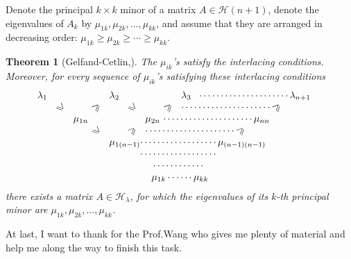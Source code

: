 \documentclass[11pt]{amsart}
\numberwithin{equation}{section}
\theoremstyle{plain}
\newtheorem{theorem}{Theorem}[section]
\theoremstyle{plain}
\numberwithin{equation}{section}
\theoremstyle{remark}
\begin{document}
Denote the principal $k \times k$ minor of a matrix $A \in \mathcal{H}(n+1)$, denote the eigenvalues of $A_k$ by $\mu_{1k},\mu_{2k},\ldots,\mu_{kk}$, and assume that they are arranged in decreasing order: $\mu_{1k}\geqslant \mu_{2k}\geqslant \cdots\geqslant\mu_{kk}$. 
\begin{theorem}[{Gelfand-Cetlin,\cite{VR}}]
The $\mu_{ik}$'s satisfy the interlacing conditions. Moreover, for every sequence of $\mu_{ik}$'s satisfying these interlacing conditions
\[
\begin{array}{p{3mm}p{3mm}p{3mm}p{3mm}p{3mm}p{3mm}p{3mm}p{3mm}p{3mm}p{45mm}}
$\lambda_1$&&&&$\lambda_2$&&&&$\lambda_3$&$\cdots\cdots\cdots\cdots\cdots\cdots\cdots\lambda_{n+1}$\\
&$\rotatebox[origin=c]{-45}{$\geqslant$}$&&$\rotatebox[origin=c]{45}{$\geqslant$}$&&$\rotatebox[origin=c]{-45}{$\geqslant$}$&&$\rotatebox[origin=c]{45}{$\geqslant$}$&$\cdots\cdots\cdots\cdots\cdots\cdots\cdots\rotatebox[origin=c]{45}{$\geqslant$}$&\\
&&$\mu_{1n}$&&&&$\mu_{2n}$&$\cdots\cdots\cdots\cdots\cdots\cdots\cdots\mu_{nn}$&&\\
&&&$\rotatebox[origin=c]{-45}{$\geqslant$}$&&$\rotatebox[origin=c]{45}{$\geqslant$}$&$\cdots\cdots\cdots\cdots\cdots\cdots\cdots\rotatebox[origin=c]{45}{$\geqslant$}$&&&\\
&&&& $\mu_{1(n-1)}$&$\phantom{\cdots}\cdots\cdots\cdots\cdots\cdots\cdots\mu_{(n-1)(n-1)}$&&&&\\
&&&&&$\phantom{\cdots}\cdots\cdots\cdots\cdots\cdots\cdots$\\
&&&&&$\phantom{\cdots\cdots}\cdots\cdots\cdots\cdots$\\
&&&&&$\phantom{\cdots\cdots}\mu_{1k}\cdots\cdots\mu_{kk}$
\end{array}
\]
there exists a matrix $A \in \mathcal{H}_\lambda$, for which the eigenvalues of its $k$-th principal minor are $\mu_{1k}, \mu_{2k},\ldots,\mu_{kk}$.
\end{theorem} 




At last, I want to thank for the Prof.Wang who gives me plenty of material and help me along the way to finish this task.

 
   



 
\end{document}
